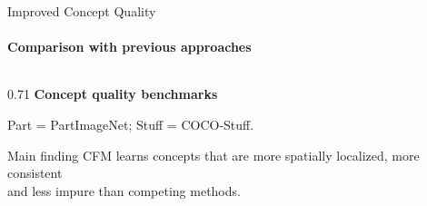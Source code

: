 \documentclass[aspectratio=169,11pt]{beamer}
\begin{document}
\begin{frame}{Improved Concept Quality}
    \framesubtitle{Comparison with previous approaches}

    \begin{columns}[T,onlytextwidth]
        \begin{column}{0.71\textwidth}
            \centering
            \scriptsize
            \textbf{Concept quality benchmarks}

            \vspace{0.3cm}


            \vspace{0.4cm}

            {\scriptsize
            Part = PartImageNet; Stuff = COCO-Stuff.
            }

            \begin{center}
            \begin{minipage}{0.85\textwidth}
                \begin{block}{\small Main finding}
                \footnotesize
                CFM learns concepts that are more spatially localized,
                more consistent \\ and less impure than competing methods.
            \end{block}
            \end{minipage}
            \end{center}
        \end{column}


\end{columns}
\end{frame}
\end{document}
